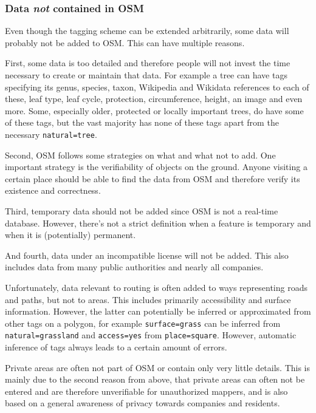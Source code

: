 		\subsubsection{Data \textit{not} contained in OSM}
		\label{subsubsec:data-not-in-osm}
		
			Even though the tagging scheme can be extended arbitrarily, some data will probably not be added to OSM.
			This can have multiple reasons.
			
			First, some data is too detailed and therefore people will not invest the time necessary to create or maintain that data.
			For example a tree can have tags specifying its genus, species, taxon, Wikipedia and Wikidata references to each of these, leaf type, leaf cycle, protection, circumference, height, an image and even more. Some, especially older, protected or locally important trees, do have some of these tags, but the vast majority has none of these tags apart from the necessary \texttt{natural=tree}.
			
			Second, OSM follows some strategies on what and what not to add.
			One important strategy is the verifiability of objects on the ground.
			Anyone visiting a certain place should be able to find the data from OSM and therefore verify its existence and correctness.
			
			Third, temporary data should not be added since OSM is not a real-time database.
			However, there's not a strict definition when a feature is temporary and when it is (potentially) permanent.
			
			And fourth, data under an incompatible license will not be added.
			This also includes data from many public authorities and nearly all companies.
			
			Unfortunately, data relevant to routing is often added to ways representing roads and paths, but not to areas.
			This includes primarily accessibility and surface information.
			However, the latter can potentially be inferred or approximated from other tags on a polygon, for example \texttt{surface=grass} can be inferred from \texttt{natural=grassland} and \texttt{access=yes} from \texttt{place=square}.
			However, automatic inference of tags always leads to a certain amount of errors.
			
			Private areas are often not part of OSM or contain only very little details.
			This is mainly due to the second reason from above, that private areas can often not be entered and are therefore unverifiable for unauthorized mappers, and is also based on a general awareness of privacy towards companies and residents.
			
